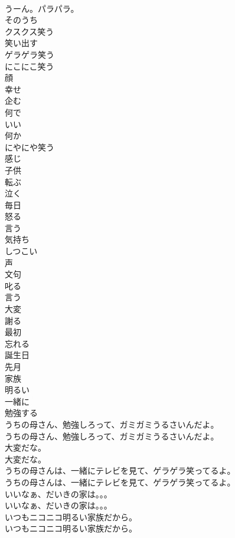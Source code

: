 \documentclass[8pt]{extreport}
\begin{document}
\begin{CJK}{UTF8}{min}
\\	うーん。パラパラ。 
\\	そのうち
\\	クスクス笑う
\\	笑い出す
\\	ゲラゲラ笑う
\\	にこにこ笑う
\\	顔
\\	幸せ
\\	企む
\\	何で
\\	いい
\\	何か
\\	にやにや笑う
\\	感じ
\\	子供
\\	転ぶ
\\	泣く
\\	毎日
\\	怒る
\\	言う
\\	気持ち
\\	しつこい
\\	声
\\	文句
\\	叱る
\\	言う
\\	大変
\\	謝る
\\	最初
\\	忘れる
\\	誕生日
\\	先月
\\	家族
\\	明るい
\\	一緒に
\\	勉強する
\\	うちの母さん、勉強しろって、ガミガミうるさいんだよ。	
\\	うちの母さん、勉強しろって、ガミガミうるさいんだよ。 
\\	大変だな。	
\\	大変だな。 
\\	うちの母さんは、一緒にテレビを見て、ゲラゲラ笑ってるよ。	
\\	うちの母さんは、一緒にテレビを見て、ゲラゲラ笑ってるよ。 
\\	いいなぁ、だいきの家は。。。	
\\	いいなぁ、だいきの家は。。。 
\\	いつもニコニコ明るい家族だから。	
\\	いつもニコニコ明るい家族だから。 

\end{CJK}
\end{document}
